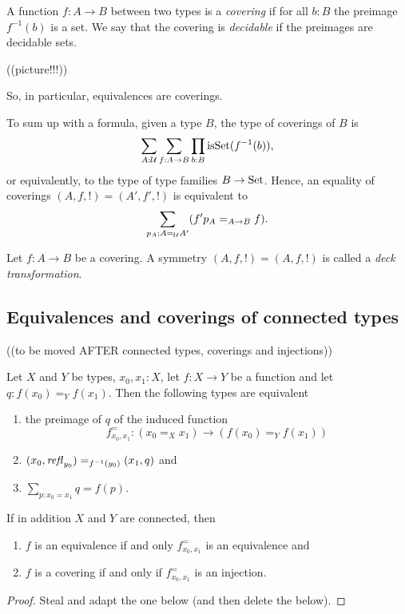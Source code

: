 \begin{definition}
  \label{def:covering}
  A function $f:A\to B$ between two types is a \emph{covering} if for all $b:B$ the preimage $f^{-1}(b)$ is a  set.  We say that the covering is \emph{decidable} if the preimages are decidable sets.
\end{definition}

((picture!!!))

So, in particular, equivalences are coverings.

To sum up with a formula, 
given a type $B$, the type of coverings of $B$ is
$$\sum_{A:\mathcal{U}}\sum_{f:A\to B}\prod_{b:B}\mathrm{isSet}(f^{-1}(b)),$$ 
or equivalently, to the type of type families $B\to\mathord{\mathrm{Set}}$.
Hence, an equality of coverings $(A,f,!)=(A',f',!)$ is equivalent to 
$$\sum_{p_A:A=_{\mathcal{U}}A'}(f'p_A=_{A\to B}f).$$
\begin{definition}
  Let $f:A\to B$ be a covering.  A symmetry $(A,f,!)=(A,f,!)$ is called a \emph{deck transformation}.
\end{definition}

\subsection{Equivalences and coverings of connected types}
\label{sec:eqconntypes}((to be moved AFTER connected types, coverings and injections))

\begin{lemma}
  \label{lem:eqandcovofconntypes}
  Let $X$ and $Y$ be types, $x_0,x_1:X$, let $f:X\to Y$ be a function and let $q:f(x_0)=_Yf(x_1)$. Then the following types are equivalent
  \begin{enumerate}
  \item the preimage of $q$ of the induced function 
    $$f^=_{x_0,x_1}:(x_0=_Xx_1)\to (f(x_0)=_Yf(x_1))$$
  \item $(x_0,\mathop{{\it refl}_{y_0}})=_{f^{-1}(y_0)}(x_1,q)$ and
  \item $\sum_{p:x_0=x_1}q=f(p)$.
  \end{enumerate}
If in addition $X$ and $Y$ are connected, then
\begin{enumerate}
\item $f$ is an equivalence if and only $f^=_{x_0,x_1}$ is an equivalence and
\item $f$ is a covering if and only if  $f^=_{x_0,x_1}$ is an injection.
\end{enumerate}

\end{lemma}
\begin{proof}
  Steal and adapt the one below (and then delete the below).
\end{proof}

